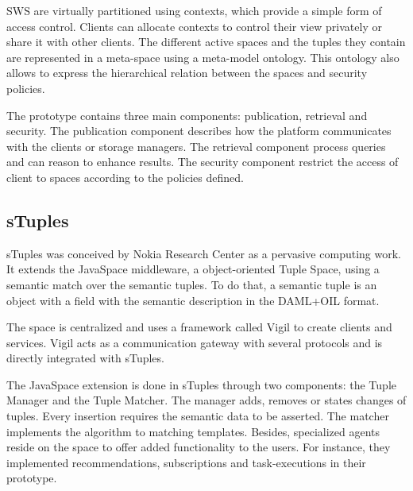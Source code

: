 SWS are virtually partitioned using contexts, which provide a simple form of access control.
Clients can allocate contexts to control their view privately or share it with other clients. %
The different active spaces and the tuples they contain are represented in a meta-space using a meta-model ontology.
This ontology also allows to express the hierarchical relation between the spaces and security policies.

The prototype contains three main components: publication, retrieval and security.
The publication component describes how the platform communicates with the clients or storage managers.
The retrieval component process queries and can reason to enhance results. %
The security component restrict the access of client to spaces according to the policies defined.  %



\subsection{sTuples}

sTuples \cite{khushraj_stuples:_2004} was conceived by Nokia Research Center as a pervasive computing work.
It extends the JavaSpace middleware, a object-oriented Tuple Space, using a semantic match over the semantic tuples.
To do that, a semantic tuple is an object with a field with the semantic description in the DAML+OIL format. %


The space is centralized and uses a framework called Vigil to create clients and services. %
Vigil acts as a communication gateway with several protocols and is directly integrated with sTuples.


The JavaSpace extension is done in sTuples through two components: the Tuple Manager and the Tuple Matcher.
The manager adds, removes or states changes of tuples.
Every insertion requires the semantic data to be asserted.
The matcher implements the algorithm to matching templates.
Besides, specialized agents reside on the space to offer added functionality to the users.
For instance, they implemented recommendations, subscriptions and task-executions in their prototype.



